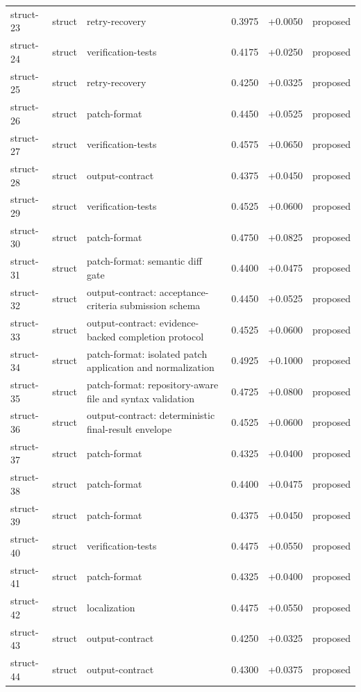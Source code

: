 \begin{center}
\begin{longtable}{llp{5.2cm}rrl}
struct-23 & struct & retry-recovery & 0.3975 & +0.0050 & proposed \\
struct-24 & struct & verification-tests & 0.4175 & +0.0250 & proposed \\
struct-25 & struct & retry-recovery & 0.4250 & +0.0325 & proposed \\
struct-26 & struct & patch-format & 0.4450 & +0.0525 & proposed \\
struct-27 & struct & verification-tests & 0.4575 & +0.0650 & proposed \\
struct-28 & struct & output-contract & 0.4375 & +0.0450 & proposed \\
struct-29 & struct & verification-tests & 0.4525 & +0.0600 & proposed \\
struct-30 & struct & patch-format & 0.4750 & +0.0825 & proposed \\
struct-31 & struct & patch-format: semantic diff gate & 0.4400 & +0.0475 & proposed \\
struct-32 & struct & output-contract: acceptance-criteria submission schema & 0.4450 & +0.0525 & proposed \\
struct-33 & struct & output-contract: evidence-backed completion protocol & 0.4525 & +0.0600 & proposed \\
struct-34 & struct & patch-format: isolated patch application and normalization & 0.4925 & +0.1000 & proposed \\
struct-35 & struct & patch-format: repository-aware file and syntax validation & 0.4725 & +0.0800 & proposed \\
struct-36 & struct & output-contract: deterministic final-result envelope & 0.4525 & +0.0600 & proposed \\
struct-37 & struct & patch-format & 0.4325 & +0.0400 & proposed \\
struct-38 & struct & patch-format & 0.4400 & +0.0475 & proposed \\
struct-39 & struct & patch-format & 0.4375 & +0.0450 & proposed \\
struct-40 & struct & verification-tests & 0.4475 & +0.0550 & proposed \\
struct-41 & struct & patch-format & 0.4325 & +0.0400 & proposed \\
struct-42 & struct & localization & 0.4475 & +0.0550 & proposed \\
struct-43 & struct & output-contract & 0.4250 & +0.0325 & proposed \\
struct-44 & struct & output-contract & 0.4300 & +0.0375 & proposed \\

\end{longtable}
\end{center}
